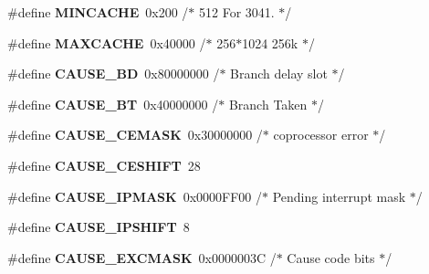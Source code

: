 \begin{DoxyCompactItemize}
\item 
\mbox{\label{group__RTEMSScoreMIPSSet__idtcpu_ga185a59ddf4cc1cd7e6d5b00679b51174}} 
\#define {\bfseries M\+I\+N\+C\+A\+C\+HE}~0x200		/$\ast$ 512       For 3041. $\ast$/
\item 
\mbox{\label{group__RTEMSScoreMIPSSet__idtcpu_ga1b4366791fe92e91d748f91bd47888e7}} 
\#define {\bfseries M\+A\+X\+C\+A\+C\+HE}~0x40000		/$\ast$ 256$\ast$1024   256k $\ast$/
\item 
\mbox{\label{group__RTEMSScoreMIPSSet__idtcpu_gaf6c84bb63ee6853d26df23dfe327ec8d}} 
\#define {\bfseries C\+A\+U\+S\+E\+\_\+\+BD}~0x80000000	/$\ast$ Branch delay slot $\ast$/
\item 
\mbox{\label{group__RTEMSScoreMIPSSet__idtcpu_ga39a5e2877f37e0893689944cf2adcf87}} 
\#define {\bfseries C\+A\+U\+S\+E\+\_\+\+BT}~0x40000000	/$\ast$ Branch Taken $\ast$/
\item 
\mbox{\label{group__RTEMSScoreMIPSSet__idtcpu_ga85f3c710d2ad23a33dd6494dcd5ef98c}} 
\#define {\bfseries C\+A\+U\+S\+E\+\_\+\+C\+E\+M\+A\+SK}~0x30000000	/$\ast$ coprocessor error $\ast$/
\item 
\mbox{\label{group__RTEMSScoreMIPSSet__idtcpu_ga5002e4fac1abb5b8c9b0805b83cd6fec}} 
\#define {\bfseries C\+A\+U\+S\+E\+\_\+\+C\+E\+S\+H\+I\+FT}~28
\item 
\mbox{\label{group__RTEMSScoreMIPSSet__idtcpu_gac67d94f04ddd8ef7d562d60810bb990c}} 
\#define {\bfseries C\+A\+U\+S\+E\+\_\+\+I\+P\+M\+A\+SK}~0x0000\+F\+F00	/$\ast$ Pending interrupt mask $\ast$/
\item 
\mbox{\label{group__RTEMSScoreMIPSSet__idtcpu_ga46decdf2d0a01629642bbd6a00e87e31}} 
\#define {\bfseries C\+A\+U\+S\+E\+\_\+\+I\+P\+S\+H\+I\+FT}~8
\item 
\mbox{\label{group__RTEMSScoreMIPSSet__idtcpu_ga9b2cd768ba71fe7d4c012c32a21132ac}} 
\#define {\bfseries C\+A\+U\+S\+E\+\_\+\+E\+X\+C\+M\+A\+SK}~0x0000003\+C	/$\ast$ Cause code bits $\ast$/

\end{DoxyCompactItemize}
